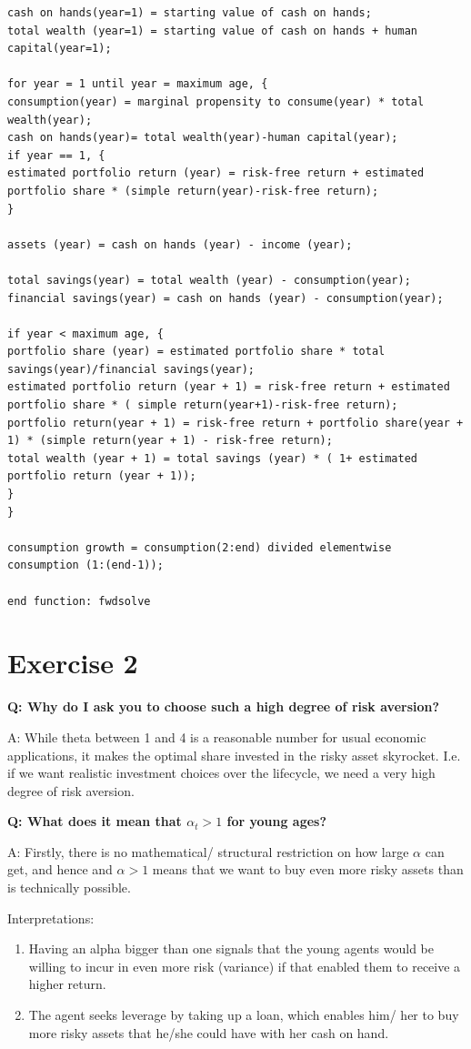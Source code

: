 \documentclass[12pt,a4paper]{article}
\begin{document}
\begin{lstlisting}[frame=single]
cash on hands(year=1) = starting value of cash on hands;
total wealth (year=1) = starting value of cash on hands + human capital(year=1);

for year = 1 until year = maximum age, {
consumption(year) = marginal propensity to consume(year) * total wealth(year);
cash on hands(year)= total wealth(year)-human capital(year);
if year == 1, {
estimated portfolio return (year) = risk-free return + estimated portfolio share * (simple return(year)-risk-free return);
}

assets (year) = cash on hands (year) - income (year);

total savings(year) = total wealth (year) - consumption(year);
financial savings(year) = cash on hands (year) - consumption(year);

if year < maximum age, {
portfolio share (year) = estimated portfolio share * total savings(year)/financial savings(year);
estimated portfolio return (year + 1) = risk-free return + estimated portfolio share * ( simple return(year+1)-risk-free return);
portfolio return(year + 1) = risk-free return + portfolio share(year + 1) * (simple return(year + 1) - risk-free return);
total wealth (year + 1) = total savings (year) * ( 1+ estimated portfolio return (year + 1));
}
}

consumption growth = consumption(2:end) divided elementwise consumption (1:(end-1));

end function: fwdsolve
\end{lstlisting}

\section*{Exercise 2}

\textbf{Q: Why do I ask you to choose such a high degree of risk aversion?}

A: While theta between 1 and 4 is a reasonable number for usual economic applications, it makes the optimal share invested in the risky asset skyrocket. I.e. if we want realistic investment choices over the lifecycle, we need a very high degree of risk aversion.

\textbf{Q: What does it mean that $\alpha_t > 1$ for young ages? }

A: Firstly, there is no mathematical/ structural restriction on how large $\alpha$ can get, and hence and $\alpha >1$ means that we want to buy even more risky assets than is technically possible.

Interpretations:
\vspace{-1em}
\begin{enumerate}
  \item Having an alpha bigger than one signals that the young agents would be willing to incur in even more risk (variance) if that enabled them to receive a higher return.
  \item The agent seeks leverage by taking up a loan, which enables him/ her to buy more risky assets that he/she could have with her cash on hand.
\end{enumerate}
\end{document}
